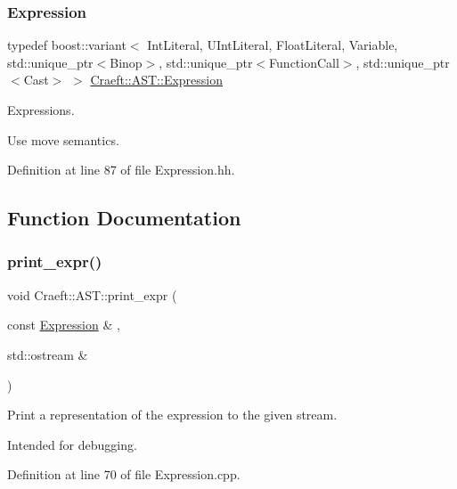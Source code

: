 \subsubsection{\texorpdfstring{Expression}{Expression}}
{\footnotesize\ttfamily typedef boost\+::variant$<$ Int\+Literal, U\+Int\+Literal, Float\+Literal, Variable, std\+::unique\+\_\+ptr$<$Binop$>$, std\+::unique\+\_\+ptr$<$Function\+Call$>$, std\+::unique\+\_\+ptr$<$Cast$>$ $>$ \hyperlink{_expression_8hh_aef28cabf6d8e7cb8324232e27e69606d}{Craeft\+::\+A\+S\+T\+::\+Expression}}



Expressions. 

Use move semantics. 

Definition at line 87 of file Expression.\+hh.



\subsection{Function Documentation}
\hypertarget{_expression_8cpp_file_aa685c19f15521a85a802b0b0a7fd9ffb}{}\label{_expression_8cpp_file_aa685c19f15521a85a802b0b0a7fd9ffb} 
\subsubsection{\texorpdfstring{print\+\_\+expr()}{print\_expr()}}
{\footnotesize\ttfamily void Craeft\+::\+A\+S\+T\+::print\+\_\+expr (\begin{DoxyParamCaption}\item[{const \hyperlink{_expression_8hh_aef28cabf6d8e7cb8324232e27e69606d}{Expression} \&}]{,  }\item[{std\+::ostream \&}]{ }\end{DoxyParamCaption})}



Print a representation of the expression to the given stream. 

Intended for debugging. 

Definition at line 70 of file Expression.\+cpp.

